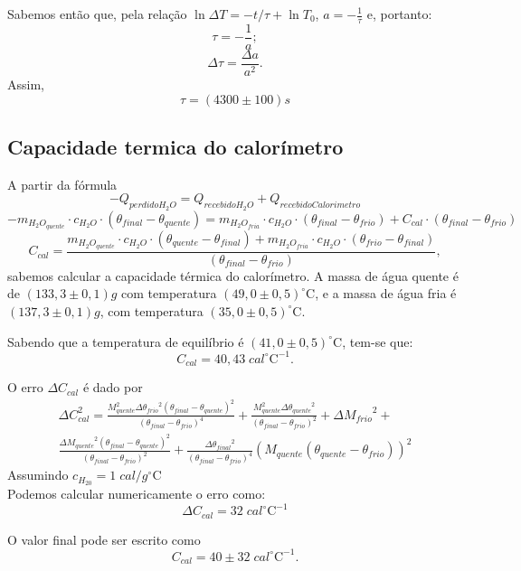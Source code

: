 \documentclass[12pt,a4paper]{article}
\begin{document}
Sabemos então que, pela relação $ \ln \Delta T = -t/\tau + \ln T_0 $, $a = -\frac{1}{\tau}$ e, portanto:
$$ \tau = -\frac{1}{a}; $$
$$ \Delta\tau =\frac{\Delta a}{a^2}. $$
Assim, 
$$ \tau = (4300 \pm 100)s $$
\subsection{Capacidade termica do calorímetro}

A partir da fórmula
$$-Q_{perdido H_2O} = Q_{recebido H_2O} + Q_{recebido Calorimetro}$$
$$-m_{H_2O_{quente}}\cdot c_{H_2O} \cdot (\theta_{final}-\theta_{quente}) = m_{H_2O_{fria}}\cdot c_{H_2O} \cdot (\theta_{final}-\theta_{frio}) + C_{cal}\cdot (\theta_{final}-\theta_{frio}) $$
$$C_{cal} = \frac{m_{H_2O_{quente}}\cdot c_{H_2O}\cdot(\theta_{quente} - \theta_{final}) + m_{H_2O_{fria}}\cdot c_{H_2O}\cdot(\theta_{frio} - \theta_{final})}{(\theta_{final}-\theta_{frio})},$$
sabemos calcular a capacidade térmica do calorímetro.
A massa de água quente é de $(133,3 \pm 0,1)g$ com temperatura $(49,0 \pm 0,5)^{\circ}\mathrm{C}$, e a massa de água fria é $(137,3 \pm 0,1)g$, com temperatura $(35,0 \pm 0,5)^{\circ}\mathrm{C}$.

Sabendo que a temperatura de equilíbrio é $(41,0 \pm 0,5)^{\circ}\mathrm{C}$, tem-se que:
$$C_{cal} = 40,43 \;cal ^{\circ}\mathrm{C}^{-1}. $$


O erro $ \Delta C_{cal} $ é dado por 
\begin{multline*}
\Delta C_{cal}^2 =  \frac{M_{{quente}}^{2} \Delta{\theta_{{frio}}}^{2} \left(\theta_{{final}} - \theta_{{quente}}\right)^{2}}{\left(\theta_{{final}} - \theta_{{frio}}\right)^{4}} + \frac{M_{{quente}}^{2} \Delta{\theta_{{quente}}}^{2}}{\left(\theta_{{final}} - \theta_{{frio}}\right)^{2}} + \Delta{M_{{frio}}}^{2} +\\ \frac{\Delta{M_{{quente}}}^{2} \left(\theta_{{final}} - \theta_{{quente}}\right)^{2}}{\left(\theta_{{final}} - \theta_{{frio}}\right)^{2}} + \frac{\Delta{\theta_{{final}}}^{2}}{\left(\theta_{{final}} - \theta_{{frio}}\right)^{4}} \left( M_{{quente}}( \theta_{{quente}} - \theta_{{frio}})\right)^{2}
\end{multline*}
Assumindo $c_{H_20} = 1 \;cal/g^{\circ}\mathrm{C}$ \\
Podemos calcular numericamente o erro como:
$$ \Delta C_{cal} = 32 \; cal ^{\circ}\mathrm{C}^{-1}$$

O valor final pode ser escrito como 
$$C_{cal} = 40 \pm 32 \;cal ^{\circ}\mathrm{C}^{-1}. $$
\end{document}
